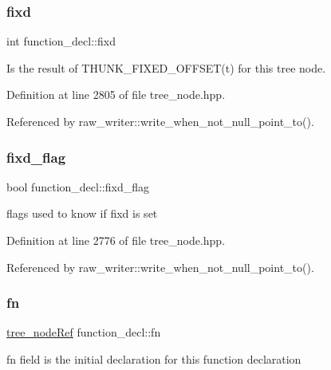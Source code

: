 \subsubsection{\texorpdfstring{fixd}{fixd}}
{\footnotesize\ttfamily int function\+\_\+decl\+::fixd}



Is the result of T\+H\+U\+N\+K\+\_\+\+F\+I\+X\+E\+D\+\_\+\+O\+F\+F\+S\+E\+T(t) for this tree node. 



Definition at line 2805 of file tree\+\_\+node.\+hpp.



Referenced by raw\+\_\+writer\+::write\+\_\+when\+\_\+not\+\_\+null\+\_\+point\+\_\+to().

\mbox{\label{structfunction__decl_ada7d104f1e74ed19d470d9913bd4df4f}} 
\subsubsection{\texorpdfstring{fixd\+\_\+flag}{fixd\_flag}}
{\footnotesize\ttfamily bool function\+\_\+decl\+::fixd\+\_\+flag}



flags used to know if fixd is set 



Definition at line 2776 of file tree\+\_\+node.\+hpp.



Referenced by raw\+\_\+writer\+::write\+\_\+when\+\_\+not\+\_\+null\+\_\+point\+\_\+to().

\mbox{\label{structfunction__decl_a7a1f7ff08c9daaa51177fdf58f95bacf}} 
\subsubsection{\texorpdfstring{fn}{fn}}
{\footnotesize\ttfamily \hyperlink{tree__node_8hpp_a6ee377554d1c4871ad66a337eaa67fd5}{tree\+\_\+node\+Ref} function\+\_\+decl\+::fn}



fn field is the initial declaration for this function declaration 




